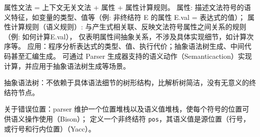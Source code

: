 \par \noindent 属性文法 = 上下文无关文法 + 属性 + 属性计算规则。
属性: 描述文法符号的语义特征，如变量的类型、值等（例: 非终结符 E 的属性 E.val = 表达式的值）；
属性计算规则（语义规则）: 与产生式相关联、反映文法符号属性之间关系的规则（例: 如何计算E.val），
仅表明属性间抽象关系，不涉及具体实现细节，如计算次序等。
应用：程序分析表达式的类型、值、执行代价；抽象语法树生成、中间代码甚至汇编生成。
可通过 Parser 生成器支持的语义动作（Semanticaction）实现计算，并应用于抽象语法树生成等场景。

\par \noindent 抽象语法树：不依赖于具体语法细节的树形结构，比解析树简洁，没有无意义的终结符节点。

\par \noindent 关于错误位置：parser 维护一个位置堆栈以及语义值堆栈，使每个符号的位置可供语义操作使用（Bison）；
定义一个非终结符 \texttt{pos}，其语义值是源位置（行号，或行号和行内位置）（Yacc）。